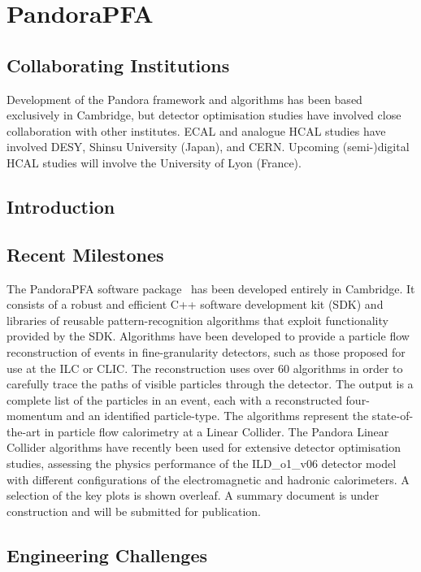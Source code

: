 \section{PandoraPFA}

\subsection{Collaborating Institutions}

Development of the Pandora framework and algorithms has been based exclusively
in Cambridge, but detector optimisation studies have involved close
collaboration with other institutes. ECAL and analogue HCAL studies have
involved DESY, Shinsu University (Japan), and CERN. Upcoming (semi-)digital HCAL
studies will involve the University of Lyon (France).

\subsection{Introduction}
\subsection{Recent Milestones}
The PandoraPFA software package~\cite{Thomson200925,Marshall2013153} has been developed entirely in Cambridge.
It consists of a robust and efficient C++ software development kit (SDK) and
libraries of reusable pattern-recognition algorithms that exploit functionality
provided by the SDK. Algorithms have been developed to provide a particle flow
reconstruction of events in fine-granularity detectors, such as those proposed
for use at the ILC or CLIC. The reconstruction uses over 60 algorithms in order
to carefully trace the paths of visible particles through the detector. The
output is a complete list of the particles in an event, each with a
reconstructed four-momentum and an identified particle-type. The algorithms
represent the state-of-the-art in particle flow calorimetry at a Linear
Collider. The Pandora Linear Collider algorithms have recently been used for
extensive detector optimisation studies, assessing the physics performance of
the ILD_o1_v06 detector model with different configurations of the
electromagnetic and hadronic calorimeters. A selection of the key plots is shown
overleaf. A summary document is under construction and will be submitted for
publication.

\subsection{Engineering Challenges}

